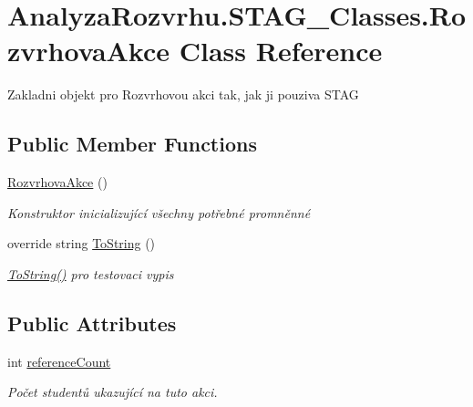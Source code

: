 \hypertarget{class_analyza_rozvrhu_1_1_s_t_a_g___classes_1_1_rozvrhova_akce}{}\section{Analyza\+Rozvrhu.\+S\+T\+A\+G\+\_\+\+Classes.\+Rozvrhova\+Akce Class Reference}
\label{class_analyza_rozvrhu_1_1_s_t_a_g___classes_1_1_rozvrhova_akce}


Zakladni objekt pro Rozvrhovou akci tak, jak ji pouziva S\+T\+AG  


\subsection*{Public Member Functions}
\begin{DoxyCompactItemize}
\item 
\hyperlink{class_analyza_rozvrhu_1_1_s_t_a_g___classes_1_1_rozvrhova_akce_a5191f6c3e7417b3f31a156b2202e1380}{Rozvrhova\+Akce} ()
\begin{DoxyCompactList}\small\item\em Konstruktor inicializující všechny potřebné promněnné \end{DoxyCompactList}\item 
override string \hyperlink{class_analyza_rozvrhu_1_1_s_t_a_g___classes_1_1_rozvrhova_akce_aa44761eaf04af4bc620ae106fb992488}{To\+String} ()
\begin{DoxyCompactList}\small\item\em \hyperlink{class_analyza_rozvrhu_1_1_s_t_a_g___classes_1_1_rozvrhova_akce_aa44761eaf04af4bc620ae106fb992488}{To\+String()} pro testovaci vypis \end{DoxyCompactList}\end{DoxyCompactItemize}
\subsection*{Public Attributes}
\begin{DoxyCompactItemize}
\item 
int \hyperlink{class_analyza_rozvrhu_1_1_s_t_a_g___classes_1_1_rozvrhova_akce_acb9f8cef4acf7425c028b4da05f4717b}{reference\+Count}
\begin{DoxyCompactList}\small\item\em Počet studentů ukazující na tuto akci. \end{DoxyCompactList}\end{DoxyCompactItemize}
